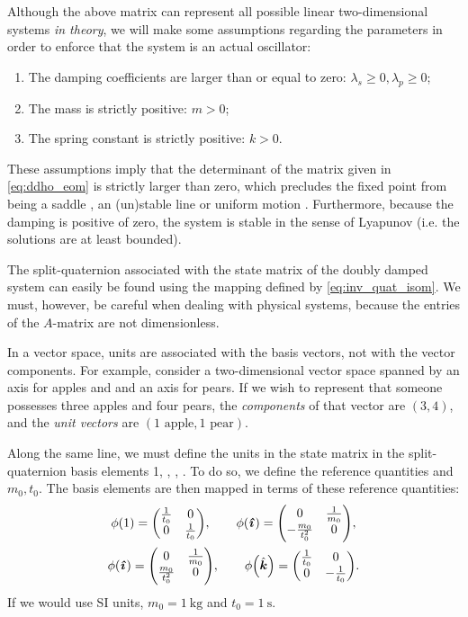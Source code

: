 Although the above matrix can represent all possible linear two-dimensional systems \emph{in theory}, we will make some assumptions regarding the parameters in order to enforce that the system is an actual oscillator:
\begin{enumerate}[label=(\roman*), align=left, leftmargin=1.5cm]
    \item The damping coefficients are larger than or equal to zero: $\lambda_s \geq 0, \lambda_p \geq 0$;
    \item The mass is strictly positive: $m > 0$;
    \item The spring constant is strictly positive: $k > 0$.
\end{enumerate}
These assumptions imply that the determinant of the matrix given in \cref{eq:ddho_eom} is strictly larger than zero, which precludes the fixed point from being a saddle , an (un)stable line  or uniform motion . Furthermore, because the damping is positive of zero, the system is stable in the sense of Lyapunov (i.e. the solutions are at least bounded).

The split-quaternion associated with the state matrix of the doubly damped system can easily be found using the mapping defined by \cref{eq:inv_quat_isom}. We must, however, be careful when dealing with physical systems, because the entries of the \(A\)-matrix are not dimensionless. 

In a vector space, units are associated with the basis vectors, not with the vector components. For example, consider a two-dimensional vector space spanned by an axis for apples and and an axis for pears. If we wish to represent that someone possesses three apples and four pears, the \emph{components} of that vector are \((3, 4)\), and the \emph{unit vectors} are \((1 \text{ apple}, 1\text{ pear})\). 

Along the same line, we must define the units in the state matrix in the split-quaternion basis elements 1, \quati, \quatj, \quatk. To do so, we define the reference quantities and \(m_0, t_0\). The basis elements are then mapped in terms of these reference quantities:
\begin{gather}
     \phi\qty(1) = \mqty(\tfrac{1}{t_0} & 0 \\ 0 & \tfrac{1}{t_0}), \qquad 
    \phi\qty(\quati) = \mqty(0 & \tfrac{1}{m_0} \\  -\tfrac{m_0}{t_0^2} & 0), \\
    \phi\qty(\quati) = \mqty(0 & \tfrac{1}{m_0} \\  \tfrac{m_0}{t_0^2} & 0), \qquad
    \phi\qty(\quatk) = \mqty(\tfrac{1}{t_0} & 0 \\ 0 & -\tfrac{1}{t_0}).
\end{gather}
If we would use SI units, \(m_0 = \SI{1}{\kilogram}\) and \(t_0 = \SI{1}{\second}\). 

